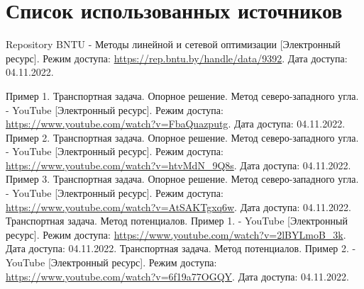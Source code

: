 \newpage

\begingroup
  \section*{Список использованных источников}

  \renewcommand{\addcontentsline}[3]{}%
  \renewcommand{\section}[2]{}%

  \begin{thebibliography}{}
    Repository BNTU - Методы линейной и сетевой оптимизации
    [Электронный ресурс].
    Режим доступа: \url{https://rep.bntu.by/handle/data/9392}.
    Дата доступа: 04.11.2022.

    Пример 1. Транспортная задача. Опорное решение. Метод северо-западного угла. - YouTube
    [Электронный ресурс].
    Режим доступа: \url{https://www.youtube.com/watch?v=FbaQuazputg}.
    Дата доступа: 04.11.2022.
    Пример 2. Транспортная задача. Опорное решение. Метод северо-западного угла. - YouTube
    [Электронный ресурс].
    Режим доступа: \url{https://www.youtube.com/watch?v=htvMdN_9Q8s}.
    Дата доступа: 04.11.2022.
    Пример 3. Транспортная задача. Опорное решение. Метод северо-западного угла. - YouTube
    [Электронный ресурс].
    Режим доступа: \url{https://www.youtube.com/watch?v=AtSAKTgxq6w}.
    Дата доступа: 04.11.2022.
    Транспортная задача. Метод потенциалов. Пример 1. - YouTube
    [Электронный ресурс].
    Режим доступа: \url{https://www.youtube.com/watch?v=2lBYLmoB_3k}.
    Дата доступа: 04.11.2022.
    Транспортная задача. Метод потенциалов. Пример 2. - YouTube
    [Электронный ресурс].
    Режим доступа: \url{https://www.youtube.com/watch?v=6f19a77OGQY}.
    Дата доступа: 04.11.2022.
  \end{thebibliography}
\endgroup

\newpage

\begingroup
  \section*{Литература, чтобы писать в \TeX~(\LaTeX)}
  \addcontentsline{toc}{section}{Литература, чтобы писать в LaTeX}

